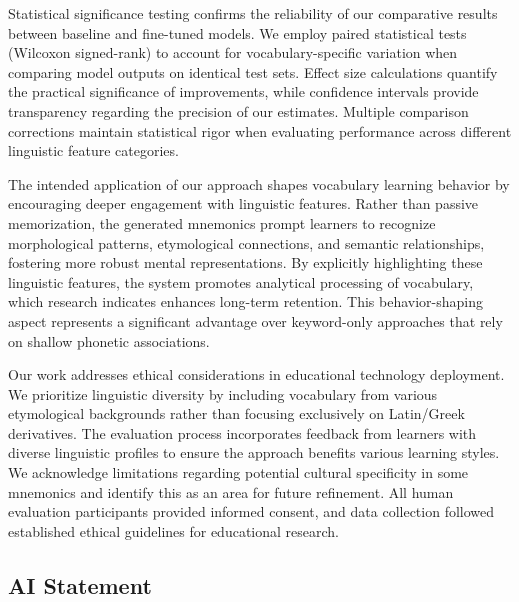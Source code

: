  Statistical significance testing confirms the reliability of our comparative results between baseline and fine-tuned models. We employ paired statistical tests (Wilcoxon signed-rank) to account for vocabulary-specific variation when comparing model outputs on identical test sets. Effect size calculations quantify the practical significance of improvements, while confidence intervals provide transparency regarding the precision of our estimates. Multiple comparison corrections maintain statistical rigor when evaluating performance across different linguistic feature categories.

 The intended application of our approach shapes vocabulary learning behavior by encouraging deeper engagement with linguistic features. Rather than passive memorization, the generated mnemonics prompt learners to recognize morphological patterns, etymological connections, and semantic relationships, fostering more robust mental representations. By explicitly highlighting these linguistic features, the system promotes analytical processing of vocabulary, which research indicates enhances long-term retention. This behavior-shaping aspect represents a significant advantage over keyword-only approaches that rely on shallow phonetic associations.

 Our work addresses ethical considerations in educational technology deployment. We prioritize linguistic diversity by including vocabulary from various etymological backgrounds rather than focusing exclusively on Latin/Greek derivatives. The evaluation process incorporates feedback from learners with diverse linguistic profiles to ensure the approach benefits various learning styles. We acknowledge limitations regarding potential cultural specificity in some mnemonics and identify this as an area for future refinement. All human evaluation participants provided informed consent, and data collection followed established ethical guidelines for educational research.

\subsection{AI Statement} \label{sec:ai-statement}
